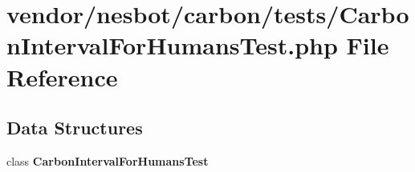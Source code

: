 \section{vendor/nesbot/carbon/tests/\+Carbon\+Interval\+For\+Humans\+Test.php File Reference}
\label{_carbon_interval_for_humans_test_8php}
\subsection*{Data Structures}
\begin{DoxyCompactItemize}
\item 
class {\bf Carbon\+Interval\+For\+Humans\+Test}
\end{DoxyCompactItemize}
